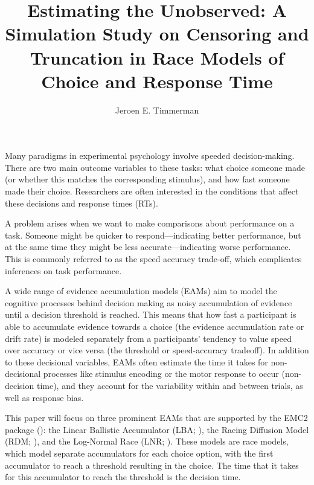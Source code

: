\documentclass[
  stu,
  longtable,
  nolmodern,
  notxfonts,
  notimes,
  draftfirst,
  colorlinks=true,linkcolor=blue,citecolor=blue,urlcolor=blue]{apa7}
\title{Estimating the Unobserved: A Simulation Study on Censoring and
Truncation in Race Models of Choice and Response Time}
\author{Jeroen E. Timmerman}
\affiliation{
{Department of Psychology, University of Amsterdam}}
\begin{document}
\maketitle


\setcounter{secnumdepth}{-\maxdimen} %

\setlength\LTleft{0pt}


Many paradigms in experimental psychology involve speeded
decision-making. There are two main outcome variables to these tasks:
what choice someone made (or whether this matches the corresponding
stimulus), and how fast someone made their choice. Researchers are often
interested in the conditions that affect these decisions and response
times (RTs).

A problem arises when we want to make comparisons about performance on a
task. Someone might be quicker to respond---indicating better
performance, but at the same time they might be less
accurate---indicating worse performance. This is commonly referred to as
the speed accuracy trade-off, which complicates inferences on task
performance.

A wide range of evidence accumulation models (EAMs) aim to model the
cognitive processes behind decision making as noisy accumulation of
evidence until a decision threshold is reached. This means that how fast
a participant is able to accumulate evidence towards a choice (the
evidence accumulation rate or drift rate) is modeled separately from a
participants' tendency to value speed over accuracy or vice versa (the
threshold or speed-accuracy tradeoff). In addition to these decisional
variables, EAMs often estimate the time it takes for non-decisional
processes like stimulus encoding or the motor response to occur
(non-decision time), and they account for the variability within and
between trials, as well as response bias.

This paper will focus on three prominent EAMs that are supported by the
EMC2 package (): the Linear
Ballistic Accumulator (LBA; ), the Racing Diffusion Model (RDM; ), and the Log-Normal Race (LNR; ). These models are race models, which model separate
accumulators for each choice option, with the first accumulator to reach
a threshold resulting in the choice. The time that it takes for this
accumulator to reach the threshold is the decision time.
\end{document}
